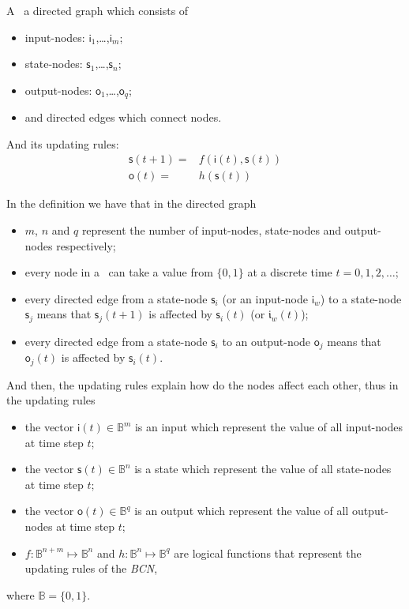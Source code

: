 \begin{definition} A \BCN\
	a directed graph which consists of 
	\begin{itemize}
	\item input-nodes: {$\mathsf{i}_1$,\ldots ,$\mathsf{i}_m$};
	\item state-nodes: {$\mathsf{s}_1$,\ldots ,$\mathsf{s}_n$};
	\item output-nodes: {$\mathsf{o}_1$,\ldots ,$\mathsf{o}_q$};
	\item and directed edges which connect nodes. 
\end{itemize}
	
And its updating rules:
\begin{equation}
\begin{split}
\mathsf{s}(t+1)=&f(\mathsf{i}(t),\mathsf{s}(t))\\
\mathsf{o}(t)=&h(\mathsf{s}(t))
\end{split}
\label{equ:1}
\end{equation}

 \end{definition}
In the definition we have that in the directed graph
\begin{itemize}
	\item $m$, $n$ and $q$ represent the number of input-nodes, state-nodes and output-nodes respectively;
          \item every node in a \BCN\ can take a value from $\{0,1\}$ at a discrete time $t=0, 1, 2,\ldots$;
	\item every directed edge from a state-node $\mathsf{s}_i$ (or an input-node $\mathsf{i}_w$) to a state-node $\mathsf{s}_j$ means that  $\mathsf{s}_j(t+1)$ is affected by $\mathsf{s}_i(t)$ (or $\mathfrak{i}_w(t)$);	
	\item every directed edge from a state-node $\mathsf{s}_i$ to an output-node $\mathsf{o}_j$ means that   $\mathsf{o}_j(t)$  is affected by $\mathsf{s}_i(t)$.  
	\end{itemize}
And then, the updating rules explain how do the nodes affect each other, thus in the updating rules
	\begin{itemize}
	\item the vector $\mathsf{i}(t)\in \mathbb{B}^m$ is an input which represent the value of all input-nodes at time step $t$; 	
	\item the vector $\mathsf{s}(t)\in \mathbb{B}^n$ is a state which represent the value of all state-nodes at time step $t$; 	
	\item the vector $\mathsf{o}(t)\in \mathbb{B}^q$ is an output which represent the value of all output-nodes at time step $t$;  
	\item $f:\mathbb{B}^{n+m}\mapsto \mathbb{B}^n$ and $h:\mathbb{B}^n\mapsto \mathbb{B}^q$ are logical functions that represent the updating rules of the {\em BCN},
\end{itemize}
where $\mathbb{B}=\{0,1\}$.

